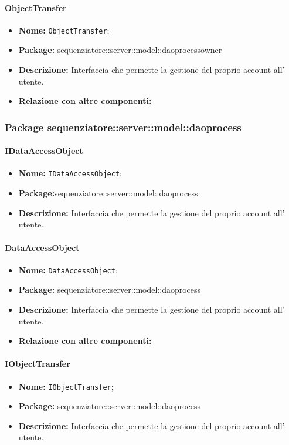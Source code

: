 \paragraph{ObjectTransfer}
	\begin{itemize}
		\item \textbf{Nome:} \texttt{ObjectTransfer};
		\item \textbf{Package:} sequenziatore::server::model::daoprocessowner
		\item \textbf{Descrizione:} Interfaccia che permette la gestione del proprio account all' utente.
		\item \textbf{Relazione con altre componenti:}
	\end{itemize}
\subsubsection{Package sequenziatore::server::model::daoprocess}
\paragraph{IDataAccessObject}
	\begin{itemize}
		\item \textbf{Nome:} \texttt{IDataAccessObject};
		\item \textbf{Package:}sequenziatore::server::model::daoprocess
		\item \textbf{Descrizione:} Interfaccia che permette la gestione del proprio account all' utente.
	\end{itemize}
\paragraph{DataAccessObject}
	\begin{itemize}
		\item \textbf{Nome:} \texttt{DataAccessObject};
		\item \textbf{Package:} sequenziatore::server::model::daoprocess
		\item \textbf{Descrizione:} Interfaccia che permette la gestione del proprio account all' utente.
		\item \textbf{Relazione con altre componenti:}
	\end{itemize}
\paragraph{IObjectTransfer}
	\begin{itemize}
		\item \textbf{Nome:} \texttt{IObjectTransfer};
		\item \textbf{Package:} sequenziatore::server::model::daoprocess
		\item \textbf{Descrizione:} Interfaccia che permette la gestione del proprio account all' utente.
	\end{itemize}
